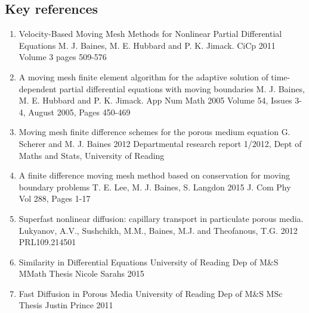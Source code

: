 \documentclass[11pt]{article}
\begin{document}
\subsection{Key references}
\begin{enumerate}
\item Velocity-Based Moving Mesh Methods for Nonlinear Partial Differential Equations
M. J. Baines, M. E. Hubbard and P. K. Jimack. CiCp 2011 Volume 3 pages 509-576
\item A moving mesh finite element algorithm for the adaptive solution of time-dependent partial differential equations with moving boundaries M. J. Baines, M. E. Hubbard and P. K. Jimack. App Num Math 2005 Volume 54, Issues 3-4, August 2005, Pages 450-469
\item Moving mesh finite difference schemes for the porous medium equation G. Scherer and M. J. Baines 2012 Departmental research report 1/2012, Dept of Maths and Stats, University of Reading
\item A finite difference moving mesh method based on conservation for moving boundary problems T. E. Lee, M. J. Baines, S. Langdon 2015 J. Com Phy Vol 288, Pages 1-17
\item Superfast nonlinear diffusion: capillary transport in particulate porous media. Lukyanov, A.V., Sushchikh, M.M., Baines, M.J. and Theofanous, T.G. 2012 PRL109.214501
\item Similarity in Differential Equations University of Reading Dep of M\&S MMath Thesis Nicole Sarahs 2015
\item Fast Diffusion in Porous Media University of Reading Dep of M\&S MSc Thesis Justin Prince 2011
\end{enumerate}
\end{document}

